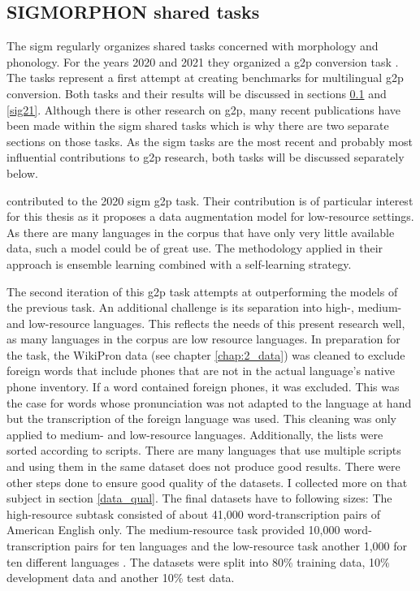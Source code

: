 \subsection{SIGMORPHON shared tasks}
\label{sig20}
\label{sig21}
The \ac{sigm} \citep{Sigmorphon.2021} regularly organizes shared tasks concerned with morphology and phonology. For the years 2020 and 2021 they organized a \ac{g2p} conversion task \citep{Ashby&Bartley.2021, gorman-etal-2020-sigmorphon}. The tasks represent a first attempt at creating benchmarks for multilingual \ac{g2p} conversion. Both tasks and their results will be discussed in sections \ref{sig20} and \ref{sig21}. Although there is other research on \ac{g2p}, many recent publications have been made within the \ac{sigm} shared tasks which is why there are two separate sections on those tasks. As the \ac{sigm} tasks are the most recent and probably most influential contributions to \ac{g2p} research, both tasks will be discussed separately below. 

\citet{yu-etal-2020} contributed to the 2020 \ac{sigm} \ac{g2p} task. Their contribution is of particular interest for this thesis as it proposes a data augmentation model for low-resource settings. As there are many languages in the corpus that have only very little available data, such a model could be of great use. The methodology applied in their approach is ensemble learning combined with a self-learning strategy. 


The second iteration of this \ac{g2p} task attempts at outperforming the models of the previous task. An additional challenge is its separation into high-, medium- and low-resource languages. This reflects the needs of this present research well, as many languages in the corpus are low resource languages. In preparation for the task, the WikiPron data (see chapter \ref{chap:2_data}) was cleaned to exclude foreign words that include phones that are not in the actual language's native phone inventory. If a word contained foreign phones, it was excluded. This was the case for words whose pronunciation was not adapted to the language at hand but the transcription of the foreign language was used. This cleaning was only applied to medium- and low-resource languages. Additionally, the lists were sorted according to scripts. There are many languages that use multiple scripts and using them in the same dataset does not produce good results. There were other steps done to ensure good quality of the datasets. I collected more on that subject in section \ref{data_qual}. 
The final datasets have to following sizes: The high-resource subtask consisted of about 41,000 word-transcription pairs of American English only. The medium-resource task provided 10,000 word-transcription pairs for ten languages and the low-resource task another 1,000 for ten different languages \citep{Ashby&Bartley.2021}. The datasets were split into 80\% training data, 10\% development data and another 10\% test data. 

